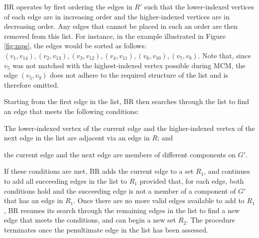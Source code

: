 \documentclass[runningheads]{llncs}
\begin{document}
BR operates by first ordering the edges in $R'$ such that the lower-indexed vertices of each edge are in increasing order and the higher-indexed vertices are in decreasing order. Any edges that cannot be placed in such an order are then removed from this list. For instance, in the example illustrated in Figure \ref{fig:mps}, the edges would be sorted as follows: $(v_1, v_{14}), (v_2, v_{13}),(v_3, v_{12}),(v_4, v_{11}),(v_6, v_{10}),(v_7, v_8)$. Note that, since $v_5$ was not matched with the highest-indexed vertex possible during MCM, the edge $(v_5, v_9)$ does not adhere to the required structure of the list and is therefore omitted.

Starting from the first edge in the list, BR then searches through the list to find an edge that meets the following conditions: 
\begin{enumerate*}[label={(\alph*)}]
	\item The lower-indexed vertex of the current edge and the higher-indexed vertex of the next edge in the list are adjacent via an edge in $R$; and
	\item the current edge and the next edge are members of different components on $G'$.
\end{enumerate*}
If these conditions are met, BR adds the current edge to a set $R_1$, and continues to add all succeeding edges in the list to $R_1$ provided that, for each edge, both conditions hold and the succeeding edge is not a member of a component of $G'$ that has an edge in $R_1$. Once there are no more valid edges available to add to $R_1$, BR resumes its search through the remaining edges in the list to find a new edge that meets the conditions, and can begin a new set $R_2$. The procedure terminates once the penultimate edge in the list has been assessed.
\end{document}
